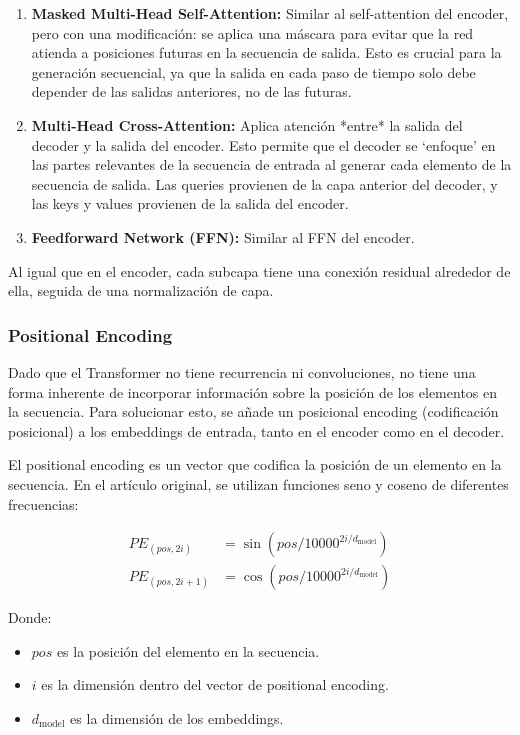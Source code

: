 \documentclass{article}
\begin{document}
\begin{enumerate}
    \item \textbf{Masked Multi-Head Self-Attention:}  Similar al self-attention del encoder, pero con una modificación: se aplica una máscara para evitar que la red atienda a posiciones futuras en la secuencia de salida.  Esto es crucial para la generación secuencial, ya que la salida en cada paso de tiempo solo debe depender de las salidas anteriores, no de las futuras.
    \item \textbf{Multi-Head Cross-Attention:} Aplica atención *entre* la salida del decoder y la salida del encoder.  Esto permite que el decoder se `enfoque' en las partes relevantes de la secuencia de entrada al generar cada elemento de la secuencia de salida. Las queries provienen de la capa anterior del decoder, y las keys y values provienen de la salida del encoder.
    \item \textbf{Feedforward Network (FFN):}  Similar al FFN del encoder.
\end{enumerate}

Al igual que en el encoder, cada subcapa tiene una conexión residual alrededor de ella, seguida de una normalización de capa.

\subsubsection{Positional Encoding}

Dado que el Transformer no tiene recurrencia ni convoluciones, no tiene una forma inherente de incorporar información sobre la posición de los elementos en la secuencia.  Para solucionar esto, se añade un posicional encoding (codificación posicional) a los embeddings de entrada, tanto en el encoder como en el decoder.

El positional encoding es un vector que codifica la posición de un elemento en la secuencia.  En el artículo original, se utilizan funciones seno y coseno de diferentes frecuencias:

\begin{align*}
PE_{(pos, 2i)} &= \sin(pos / 10000^{2i/d_{\text{model}}}) \\
PE_{(pos, 2i+1)} &= \cos(pos / 10000^{2i/d_{\text{model}}})
\end{align*}

Donde:

\begin{itemize}
    \item \(pos\) es la posición del elemento en la secuencia.
    \item \(i\) es la dimensión dentro del vector de positional encoding.
    \item \(d_{\text{model}}\) es la dimensión de los embeddings.
\end{itemize}
\end{document}
